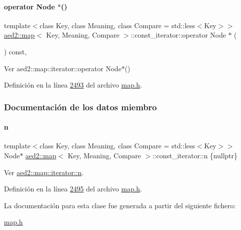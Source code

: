 \paragraph{\texorpdfstring{operator Node $\ast$()}{operator Node *()}}
{\footnotesize\ttfamily template$<$class Key, class Meaning, class Compare = std\+::less$<$\+Key$>$$>$ \\
\hyperlink{classaed2_1_1map}{aed2\+::map}$<$ Key, Meaning, Compare $>$\+::const\+\_\+iterator\+::operator Node $\ast$ (\begin{DoxyParamCaption}{ }\end{DoxyParamCaption}) const\hspace{0.3cm}{\ttfamily [inline]}, {\ttfamily [private]}}



Ver aed2\+::map\+::iterator\+::operator Node$\ast$() 



Definición en la línea \hyperlink{map_8h_source_l02493}{2493} del archivo \hyperlink{map_8h_source}{map.\+h}.



\subsubsection{Documentación de los datos miembro}
\mbox{\label{classaed2_1_1map_1_1const__iterator_a921e123f9c7f94610cf9fee3ab55d277_a921e123f9c7f94610cf9fee3ab55d277}} 
\paragraph{\texorpdfstring{n}{n}}
{\footnotesize\ttfamily template$<$class Key, class Meaning, class Compare = std\+::less$<$\+Key$>$$>$ \\
Node$\ast$ \hyperlink{classaed2_1_1map}{aed2\+::map}$<$ Key, Meaning, Compare $>$\+::const\+\_\+iterator\+::n \{nullptr\}\hspace{0.3cm}{\ttfamily [private]}}



Ver \hyperlink{classaed2_1_1map_1_1iterator_adf8633ef71bb6c1fc01c0abe8728fd93_adf8633ef71bb6c1fc01c0abe8728fd93}{aed2\+::map\+::iterator\+::n}. 



Definición en la línea \hyperlink{map_8h_source_l02495}{2495} del archivo \hyperlink{map_8h_source}{map.\+h}.



La documentación para esta clase fue generada a partir del siguiente fichero\+:\begin{DoxyCompactItemize}
\item 
\hyperlink{map_8h}{map.\+h}\end{DoxyCompactItemize}
